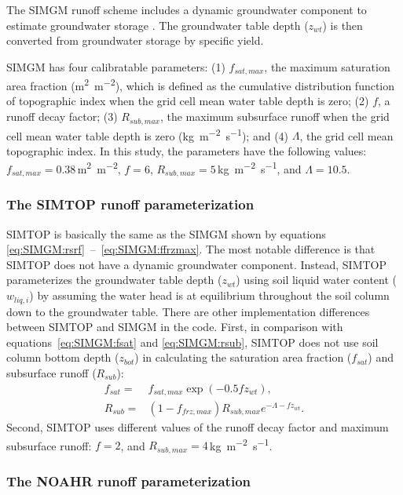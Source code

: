 \documentclass[essd]{copernicus}
\begin{document}
The SIMGM runoff scheme includes a dynamic groundwater component to estimate
groundwater storage \citep{niu2007JGRA}. The groundwater table depth (\(z_{wt}\))
is then converted from groundwater storage by specific yield.

SIMGM has four calibratable parameters: (1) \(f_{sat,max}\), the maximum
saturation area fraction (\si{m^2~m^{-2}}), which is defined as the cumulative
distribution function of topographic index when the grid cell mean water table
depth is zero; (2) \(f\), a runoff decay factor; (3) \(R_{sub,max}\), the
maximum subsurface runoff when the grid cell mean water table depth is zero
(\si{kg~m^{-2}~s^{-1}}); and (4) \(\Lambda\), the grid cell mean topographic
index. In this study, the parameters have the following values: \(f_{sat,max} =
0.38\)\,\si{m^2~m^{-2}}, $f=6$, $R_{sub,max}=5$\,\si{kg~m^{-2}~s^{-1}}, and
\(\Lambda = 10.5\).

\subsubsection{The SIMTOP runoff parameterization}

SIMTOP is basically the same as the SIMGM shown by equations
\eqref{eq:SIMGM:rsrf}~--~\eqref{eq:SIMGM:ffrzmax}. The most notable difference
is that SIMTOP does not have a dynamic groundwater component. Instead, SIMTOP
parameterizes the groundwater table depth (\(z_{wt}\)) using soil liquid water
content (\(w_{liq,i}\)) by assuming the water head is at equilibrium throughout
the soil column down to the groundwater table. There are other implementation
differences between SIMTOP and SIMGM in the code. First, in comparison with
equations~\eqref{eq:SIMGM:fsat} and \eqref{eq:SIMGM:rsub}, SIMTOP does not use
soil column bottom depth (\(z_{bot}\)) in calculating the saturation area
fraction (\(f_{sat}\)) and subsurface runoff (\(R_{sub}\)):
\begin{align}
  f_{sat} = & f_{sat,max} \exp(-0.5 f z_{wt}) \text{,} \\
  R_{sub} = & (1-f_{frz,max}) R_{sub,max} e^{-\Lambda-f z_{wt}} \text{.}
\end{align}
Second, SIMTOP uses different values of the runoff decay factor and maximum
subsurface runoff: \(f=2\), and \(R_{sub,max}=4\)\,\si{kg~m^{-2}~s^{-1}}.


\subsubsection{The NOAHR runoff parameterization}
\end{document}
